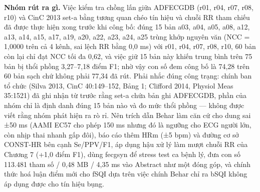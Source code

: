 \documentclass[12pt,a4paper]{article}
\begin{document}
\noindent \textbf{\color{tdtblue}Nhóm rút ra gì.} Việc kiểm tra chồng lấn giữa ADFECGDB (r01, r04, r07, r08, r10) và CinC 2013 set-a bằng tương quan chéo tín hiệu và chuỗi RR tham chiếu đã được thực hiện xong trước khi công bố: đúng 15 bản a03, a04, a05, a08, a12, a13, a14, a15, a17, a19, a20, a22, a23, a24, a25 trùng khớp nguyên văn (NCC = 1,0000 trên cả 4 kênh, sai lệch RR bằng 0,0 ms) với r01, r04, r07, r08, r10, 60 bản còn lại chỉ đạt NCC tối đa 0,62, và việc giữ 15 bản này khiến trung bình trên 75 bản bị thổi phồng 3,27–7,18 điểm F1; nhờ vậy con số đem công bố là 74,28 trên 60 bản sạch chứ không phải 77,34 đã rút. Phải nhắc đúng công trạng: chính ban tổ chức (Silva 2013, CinC 40:149–152, Bảng 1; Clifford 2014, Physiol Meas 35:1521) đã ghi nhận từ trước rằng set-a chứa bản ghi ADFECGDB, phần của nhóm chỉ là định danh đúng 15 bản nào và đo mức thổi phồng — không được viết rằng nhóm phát hiện ra rò rỉ. Nên trích dẫn Behar làm căn cứ cho dung sai ±50 ms (AAMI EC57 cho phép 150 ms nhưng đó là ngưỡng cho ECG người lớn, còn nhịp thai nhanh gấp đôi), báo cáo thêm HRm (±5 bpm) và đường cơ sở CONST-HR bên cạnh Se/PPV/F1, áp dụng hậu xử lý làm mượt chuỗi RR của Chương 7 (+1,0 điểm F1), dùng fecgsyn để stress test ca bệnh lý, đưa con số 113.481 tham số / 0,48 MB / 4,35 ms vào Abstract như một đóng góp, và chính thức hoá luận điểm mới cho fSQI dựa trên việc chính Behar chỉ ra bSQI không áp dụng được cho tín hiệu bụng.\par\vspace{3pt}
\vspace{6pt}
\end{document}
